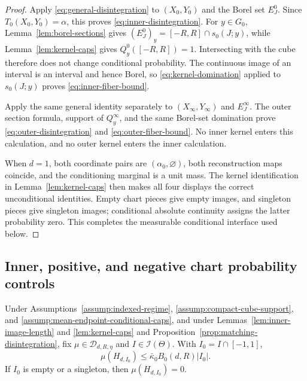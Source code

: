 \begin{proof}
Apply \eqref{eq:general-disintegration} to $(X_0,Y_0)$ and the Borel set
$E^0_J$.  Since $T_0(X_0,Y_0)=\alpha$, this proves
\eqref{eq:inner-disintegration}.  For $y\in G_0$,
Lemma~\ref{lem:borel-sections} gives
$(E^0_J)_y=[-R,R]\cap s_0(J;y)$, while Lemma~\ref{lem:kernel-caps} gives
$Q^0_y([-R,R])=1$.  Intersecting with the cube therefore does not change
conditional probability.  The continuous image of an interval is an
interval and hence Borel, so \eqref{eq:kernel-domination} applied to
$s_0(J;y)$ proves \eqref{eq:inner-fiber-bound}.

Apply the same general identity separately to $(X_\infty,Y_\infty)$ and
$E^\infty_J$.  The outer section formula, support of $Q^\infty_y$, and the
same Borel-set domination prove \eqref{eq:outer-disintegration} and
\eqref{eq:outer-fiber-bound}.  No inner kernel enters this calculation, and
no outer kernel enters the inner calculation.

When $d=1$, both coordinate pairs are $(\alpha_0,\varnothing)$, both
reconstruction maps coincide, and the conditioning marginal is a unit mass.
The kernel identification in Lemma~\ref{lem:kernel-caps} then makes all four
displays the correct unconditional identities.  Empty chart pieces give
empty images, and singleton pieces give singleton images; conditional
absolute continuity assigns the latter probability zero.  This completes
the measurable conditional interface used below.
\end{proof}

\subsection{Inner, positive, and negative chart probability controls}
\label{app:chart-probabilities}

\begin{proposition}
\label{prop:inner-chart-probability}
Under Assumptions~\ref{assump:indexed-regime},
\ref{assump:compact-cube-support}, and
\ref{assump:mean-endpoint-conditional-caps}, and under
Lemmas~\ref{lem:inner-image-length} and \ref{lem:kernel-caps} and
Proposition~\ref{prop:matching-disintegration}, fix
$\mu\in\mathcal D_{d,R,\eta}$ and $I\in\mathcal I(\Theta)$.  With
$I_0=I\cap[-1,1]$,
\[
\mu(H_{d,I_0})\leq\bar\kappa_0B_0(d,R)|I_0|.
\]
If $I_0$ is empty or a singleton, then $\mu(H_{d,I_0})=0$.
\end{proposition}

